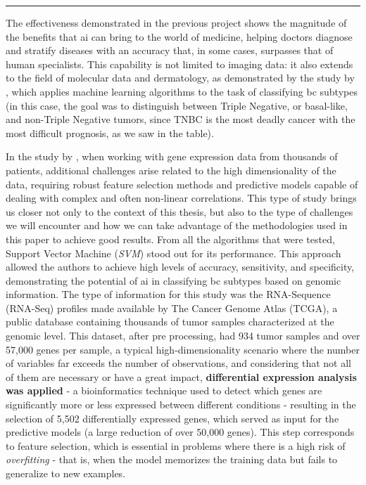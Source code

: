 \noindent\rule{\linewidth}{0.4pt}

The effectiveness demonstrated in the previous project shows the magnitude of
the benefits that \gls{ai} can bring to the world of medicine, helping doctors
diagnose and stratify diseases with an accuracy that, in some cases, surpasses
that of human specialists. This capability is not limited to imaging data: it
also extends to the field of molecular data and dermatology, as demonstrated by
the study by \textcite{bca_subtypes_with_ml_Wu_2021}, which applies machine
learning algorithms to the task of classifying \gls{bc} subtypes (in this case,
the goal was to distinguish between Triple Negative, or basal-like, and
non-Triple Negative tumors, since TNBC is the most deadly cancer with the most
difficult prognosis, as we saw in the table).

In the study by \textcite{bca_subtypes_with_ml_Wu_2021}, when working with gene
expression data from thousands of patients, additional challenges arise related
to the high dimensionality of the data, requiring robust feature selection
methods and predictive models capable of dealing with complex and often
non-linear correlations. This type of study brings us closer not only to the
context of this thesis, but also to the type of challenges we will encounter
and how we can take advantage of the methodologies used in this paper to
achieve good results. From all the algorithms that were tested, Support Vector
Machine (\textit{SVM}) stood out for its performance. This approach allowed the
authors to achieve high levels of accuracy, sensitivity, and specificity,
demonstrating the potential of \gls{ai} in classifying \gls{bc} subtypes based
on genomic information. The type of information for this study was the
RNA-Sequence (RNA-Seq) profiles made available by The Cancer Genome Atlas
(TCGA), a public database containing thousands of tumor samples characterized
at the genomic level. This dataset, after pre processing, had 934 tumor samples
and over 57{,}000 genes per sample, a typical high-dimensionality scenario
where the number of variables far exceeds the number of observations, and
considering that not all of them are necessary or have a great impact,
\textbf{differential expression analysis was applied} - a bioinformatics
technique used to detect which genes are significantly more or less expressed
between different conditions - resulting in the selection of 5{,}502
differentially expressed genes, which served as input for the predictive models
(a large reduction of over 50{,}000 genes). This step corresponds to feature
selection, which is essential in problems where there is a high risk of
\textit{overfitting} - that is, when the model memorizes the training data but
fails to generalize to new examples.

